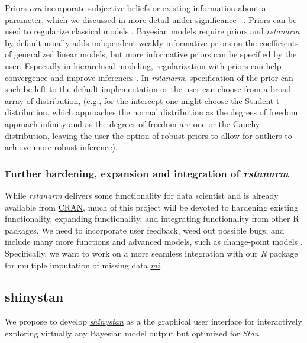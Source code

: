 \documentclass[11pt,notitlepage]{article}
\begin{document}
Priors \textit{can} incorporate subjective beliefs or existing information 
about a parameter,  which we discussed in more detail under significance \
\cite{carlin1997bayes}. 
Priors can be used to regularize classical models \cite{gelman2008weakly}. 
Bayesian models require priors and \textit{rstanarm} by default usually
adds independent weakly informative priors on the coefficients of generalized linear models, 
but more informative priors can be specified by the user. Especially in hierarchical modeling, 
regularization with priors can help convergence and improve inferences 
\cite{Gelman-Hill_2014}. In \textit{rstanarm}, specification of the prior 
can such be left to the default implementation or the user can choose from 
a broad array of distribution, (e.g., for the intercept one might choose the 
Student t distribution, which approaches the normal distribution as the 
degrees of freedom approach infinity and as the degrees of freedom are 
one or the Cauchy distribution, leaving the user the option of robust 
priors to allow for outliers to achieve more robust inference). 

\subsubsection*{Further hardening, expansion and integration of \textit{rstanarm}}
While \textit{rstanarm} delivers some functionality for data scientist and is already available from 
\href{https://cran.rstudio.com/web/packages/rstanarm/}{CRAN}, much of this project will be devoted to hardening existing functionality, 
expanding functionality, and integrating functionality from other R packages. We need to incorporate user feedback, weed out 
possible bugs, and include many more functions and advanced models, such as change-point models \cite{Hall2000}. Specifically, 
we want to work on a more seamless integration with our \textit{R} package for multiple imputation of missing data 
\href{https://cran.r-project.org/web/packages/mi/index.html}{\textit{mi}}.

\subsection*{shinystan}
We propose to develop \href{http://andrewgelman.com/2015/03/02/introducing-shinystan/}
{\textit{shinystan}} \cite{GabryISCB2015,shinystan} as a the 
graphical user interface for interactively 
exploring virtually any Bayesian model output but optimized for \textit{Stan}. 
\end{document}
